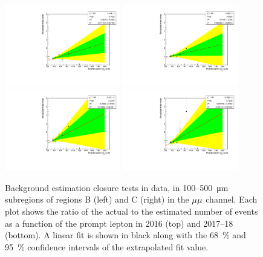 \begin{figure}
\centering
\includegraphics[width=0.45\textwidth]{figures/bg/mumu_data_2016_displacedLeading_ratiosVsPromptD0.pdf}
\includegraphics[width=0.45\textwidth]{figures/bg/mumu_data_2016_displacedSubleading_ratiosVsPromptD0.pdf}
\includegraphics[width=0.45\textwidth]{figures/bg/mumu_data_2017_2018_displacedLeading_ratiosVsPromptD0.pdf}
\includegraphics[width=0.45\textwidth]{figures/bg/mumu_data_2017_2018_displacedSubleading_ratiosVsPromptD0.pdf}
\caption{Background estimation closure tests in data, in 100--\SI{500}{\um} subregions of regions B (left) and C (right) in the ${\mu}{\mu}$ channel. Each plot shows the ratio of the actual to the estimated number of events as a function of the prompt lepton \ad in 2016 (top) and 2017--18 (bottom). A linear fit is shown in black along with the \SI{68}{\percent} and \SI{95}{\percent} confidence intervals of the extrapolated fit value.}
\label{100to500um_fits_mumu}
\end{figure}